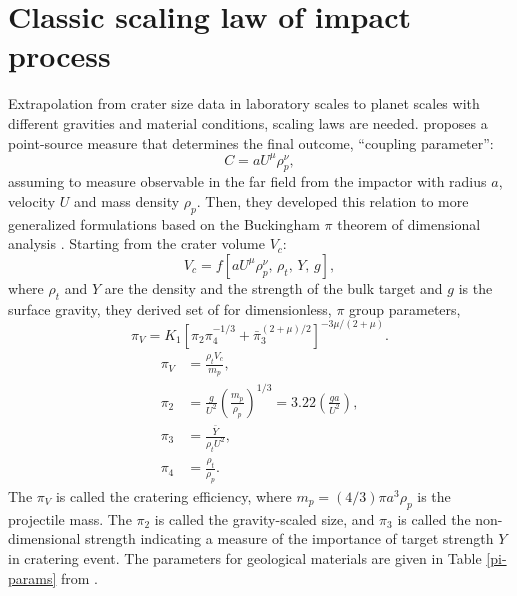 \documentclass[3p,authoryear]{elsarticle}
\begin{document}
\section{Classic scaling law of impact process}\label{sec:piscaling}
Extrapolation from crater size data in laboratory scales to planet scales with different gravities and material conditions, scaling laws are needed.
\citet{holsapple1987} proposes a point-source measure that determines the final outcome, ``coupling parameter'':
\begin{equation}
	C=aU^\mu\rho_p^\nu,
\end{equation}
assuming to measure observable in the far field from the impactor with radius $a$, velocity $U$ and mass density $\rho_p$.
Then, they developed this relation to more generalized formulations based on the Buckingham $\pi$ theorem of dimensional analysis \citep{buckingham1914}.
Starting from the crater volume $V_c$:
\begin{equation}
	V_c=f[aU^\mu\rho_p^\nu,\, \rho_t,\,Y,\, g], \label{pi-start-eq}
\end{equation}
where $\rho_t$ and $Y$ are the density and the strength of the bulk target and $g$ is the surface gravity, they derived set of for dimensionless, $\pi$ group parameters,
\begin{equation}
	\pi_V=K_1\left[\pi_2\pi_4^{-1/3}+\bar{\pi}_3^{(2+\mu)/2}\right]^{-3\mu/(2+\mu)}.\label{simple-pi}
 \end{equation}
\begin{align}
	\pi_V&=\frac{\rho_t V_c}{m_p}, \label{piV}\\
	\pi_2&=\frac{g}{U^2}\left(\frac{m_p}{\rho_p}\right)^{1/3}=3.22\left(\frac{ga}{U^2}\right),\\
	\pi_3&=\frac{\bar{Y}}{\rho_tU^2}, \label{pi3}\\
	\pi_4&=\frac{\rho_t}{\rho_p}.
\end{align}
The $\pi_V$ is called the cratering efficiency, where $m_p=(4/3)\pi a^3\rho_p$ is the projectile mass.
The $\pi_2$ is called the gravity-scaled size, and $\pi_3$ is called the non-dimensional strength indicating a measure of the importance of target strength $Y$ in cratering event.
 The parameters for geological materials are given in Table \ref{pi-params} from \citet{holsapple1993}.
\end{document}
